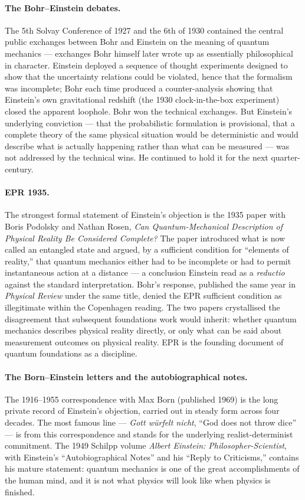\paragraph{The Bohr--Einstein debates.}
The 5th Solvay Conference of 1927 and the 6th of 1930 contained the central public exchanges between Bohr and Einstein on the meaning of quantum mechanics --- exchanges Bohr himself later wrote up as essentially philosophical in character. Einstein deployed a sequence of thought experiments designed to show that the uncertainty relations could be violated, hence that the formalism was incomplete; Bohr each time produced a counter-analysis showing that Einstein's own gravitational redshift (the 1930 clock-in-the-box experiment) closed the apparent loophole. Bohr won the technical exchanges. But Einstein's underlying conviction --- that the probabilistic formulation is provisional, that a complete theory of the same physical situation would be deterministic and would describe what is actually happening rather than what can be measured --- was not addressed by the technical wins. He continued to hold it for the next quarter-century.

\paragraph{EPR 1935.}
The strongest formal statement of Einstein's objection is the 1935 paper with Boris Podolsky and Nathan Rosen, \emph{Can Quantum-Mechanical Description of Physical Reality Be Considered Complete?} The paper introduced what is now called an entangled state and argued, by a sufficient condition for ``elements of reality,'' that quantum mechanics either had to be incomplete or had to permit instantaneous action at a distance --- a conclusion Einstein read as a \emph{reductio} against the standard interpretation. Bohr's response, published the same year in \emph{Physical Review} under the same title, denied the EPR sufficient condition as illegitimate within the Copenhagen reading. The two papers crystallised the disagreement that subsequent foundations work would inherit: whether quantum mechanics describes physical reality directly, or only what can be said about measurement outcomes on physical reality. EPR is the founding document of quantum foundations as a discipline.

\paragraph{The Born--Einstein letters and the autobiographical notes.}
The 1916--1955 correspondence with Max Born (published 1969) is the long private record of Einstein's objection, carried out in steady form across four decades. The most famous line --- \emph{Gott w\"urfelt nicht}, ``God does not throw dice'' --- is from this correspondence and stands for the underlying realist-determinist commitment. The 1949 Schilpp volume \emph{Albert Einstein: Philosopher-Scientist}, with Einstein's ``Autobiographical Notes'' and his ``Reply to Criticisms,'' contains his mature statement: quantum mechanics is one of the great accomplishments of the human mind, and it is not what physics will look like when physics is finished.

